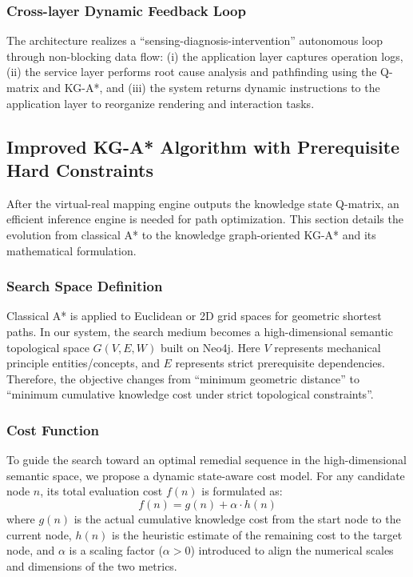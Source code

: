 \documentclass{ieeeaccess}
\begin{document}
\subsubsection{Cross-layer Dynamic Feedback Loop}
The architecture realizes a ``sensing-diagnosis-intervention'' autonomous loop through non-blocking data flow: (i) the application layer captures operation logs, (ii) the service layer performs root cause analysis and pathfinding using the Q-matrix and KG-A*, and (iii) the system returns dynamic instructions to the application layer to reorganize rendering and interaction tasks.

\subsection{Improved KG-A* Algorithm with Prerequisite Hard Constraints}
After the virtual-real mapping engine outputs the knowledge state Q-matrix, an efficient inference engine is needed for path optimization. This section details the evolution from classical A* to the knowledge graph-oriented KG-A* and its mathematical formulation.

\subsubsection{Search Space Definition}
Classical A* is applied to Euclidean or 2D grid spaces for geometric shortest paths. In our system, the search medium becomes a high-dimensional semantic topological space $G(V,E,W)$ built on Neo4j. Here $V$ represents mechanical principle entities/concepts, and $E$ represents strict prerequisite dependencies. Therefore, the objective changes from ``minimum geometric distance'' to ``minimum cumulative knowledge cost under strict topological constraints''.

\subsubsection{Cost Function}
To guide the search toward an optimal remedial sequence in the high-dimensional semantic space, we propose a dynamic state-aware cost model. For any candidate node $n$, its total evaluation cost $f(n)$ is formulated as:
\begin{equation}
f(n)=g(n)+\alpha \cdot h(n)
\end{equation}
where $g(n)$ is the actual cumulative knowledge cost from the start node to the current node, $h(n)$ is the heuristic estimate of the remaining cost to the target node, and $\alpha$ is a scaling factor ($\alpha > 0$) introduced to align the numerical scales and dimensions of the two metrics.
\end{document}
